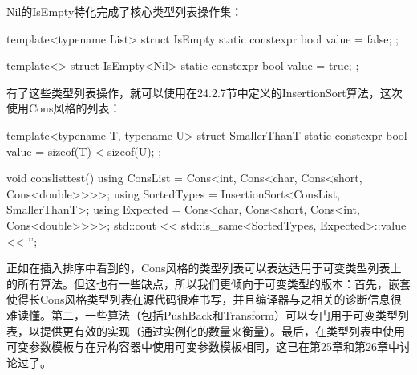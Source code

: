 Nil的IsEmpty特化完成了核心类型列表操作集：

\begin{cpp}
template<typename List>
struct IsEmpty {
	static constexpr bool value = false;
};

template<>
struct IsEmpty<Nil> {
	static constexpr bool value = true;
};
\end{cpp}

有了这些类型列表操作，就可以使用在24.2.7节中定义的InsertionSort算法，这次使用Cons风格的列表：

\begin{cpp}
template<typename T, typename U>
struct SmallerThanT {
	static constexpr bool value = sizeof(T) < sizeof(U);
};

void conslisttest() {
	using ConsList = Cons<int, Cons<char, Cons<short, Cons<double>>>>;
	using SortedTypes = InsertionSort<ConsList, SmallerThanT>;
	using Expected = Cons<char, Cons<short, Cons<int, Cons<double>>>>;
	std::cout << std::is_same<SortedTypes, Expected>::value << '\n';
}
\end{cpp}

正如在插入排序中看到的，Cons风格的类型列表可以表达适用于可变类型列表上的所有算法。但这也有一些缺点，所以我们更倾向于可变类型的版本：首先，嵌套使得长Cons风格类型列表在源代码很难书写，并且编译器与之相关的诊断信息很难读懂。第二，一些算法（包括PushBack和Transform）可以专门用于可变类型列表，以提供更有效的实现（通过实例化的数量来衡量）。最后，在类型列表中使用可变参数模板与在异构容器中使用可变参数模板相同，这已在第25章和第26章中讨论过了。





















